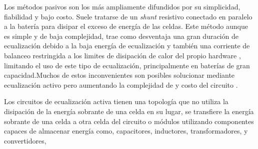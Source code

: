 Los métodos pasivos son los más ampliamente difundidos por su simplicidad, fiabilidad y bajo costo. Suele tratarse de un \textit{shunt} resistivo conectado en paralelo a la batería para disipar el exceso de energía de las celdas. Este método aunque es simple y de baja complejidad, trae como desventaja una gran duración de ecualización debido a la baja energía de ecualización y también una corriente de balanceo restringida a los limites de disipación de calor del propio hardware , limitando el uso de este tipo de ecualización, principalmente en baterías de gran capacidad\cite{hua2020comprehensive}.Muchos de estos inconvenientes son posibles solucionar mediante ecualización activo pero aumentando la complejidad de y costo del circuito \cite{pericsoarua2018passive}.

Los circuitos de ecualización activa tienen una topología que no utiliza la disipación de la energía sobrante de una celda en su lugar, se transfiere la energía sobrante de una celda a otra celda del circuito o módulos utilizando componentes capaces de almacenar energía como, capacitores, inductores, transformadores, y convertidores,








